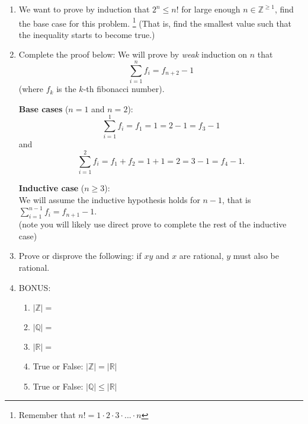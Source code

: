 \documentclass[11pt, oneside]{article}   	%
\newcommand{\reals}{\mathbb{R}}
\newcommand{\ints}{\mathbb{Z}}
\begin{document}
\begin{enumerate}
\begin{enumerate}
\end{enumerate}

\item We want to prove by induction that $2^n \le n!$ for large enough $n\in \ints^{\ge 1}$, find the base case for this problem.%
\footnote{Remember that $n! = 1 \cdot 2 \cdot 3 \cdot ... \cdot n$} 
(That is, find the smallest value such that the inequality starts to become true.)
\vspace{8em}

\item Complete the proof below:
We will prove by \textit{weak} induction on $n$ that \[\sum_{i=1}^{n}f_i = f_{n+2}-1\] (where $f_k$ is the $k$-th fibonacci number). 

\textbf{Base cases} ($n=1$ and $n=2$):
 \[\sum_{i=1}^{1}f_i = f_1 = 1 = 2 - 1 = f_{3}-1\] and
 \[\sum_{i=1}^{2}f_i = f_1 + f_2 = 1 + 1 = 2 = 3 - 1 = f_{4}-1.\]
 
\textbf{Inductive case} ($n\ge 3$):\\
\hspace*{3em}We will assume the inductive hypothesis holds for $n-1$, that is $\sum_{i=1}^{n-1}f_i = f_{n+1}-1$. \\
\hspace*{3em} (note you will likely use direct prove to complete the rest of the inductive case)
 \vspace{16em}

\item Prove or disprove the following: if $xy$ and $x$ are rational, $y$ must also be rational. 
\vspace{6em}


\clearpage
\item BONUS: 
\begin{enumerate}
\item $|\ints|=$
\item $|\mathbb{Q}|=$
\item $|\reals|=$
\item True or False: $|\ints| = |\reals|$
\item True or False: $|\mathbb{Q}| \le |\reals|$
\end{enumerate}

\end{enumerate}
\end{document}
